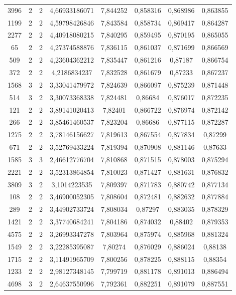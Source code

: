 \begin{longtable}{|c|c|c|c|c|c|c|c|}
3996 & 2 & 2 & 4,66933186071 & 7,844252 & 0,858316 & 0,868986 & 0,863855 \\
1199 & 2 & 2 & 4,59798426846 & 7,843584 & 0,858734 & 0,869417 & 0,864287 \\
2277 & 2 & 2 & 4,40918080215 & 7,840295 & 0,859495 & 0,870195 & 0,865055 \\
65 & 2 & 2 & 4,27374588876 & 7,836115 & 0,861037 & 0,871699 & 0,866569 \\
509 & 2 & 2 & 4,23604362212 & 7,835447 & 0,861216 & 0,87187 & 0,866754 \\
372 & 2 & 2 & 4,2186834237 & 7,832528 & 0,861679 & 0,87233 & 0,867237 \\
1568 & 3 & 2 & 3,33041479972 & 7,824639 & 0,866097 & 0,875239 & 0,871448 \\
514 & 3 & 2 & 3,30073368338 & 7,824481 & 0,86684 & 0,876017 & 0,872235 \\
121 & 2 & 2 & 3,89141020413 & 7,82401 & 0,866722 & 0,876974 & 0,872142 \\
266 & 2 & 2 & 3,85461460537 & 7,823204 & 0,86686 & 0,877115 & 0,872287 \\
1275 & 2 & 2 & 3,78146156627 & 7,819613 & 0,867554 & 0,877834 & 0,87299 \\
671 & 2 & 2 & 3,52769433224 & 7,819394 & 0,870908 & 0,881146 & 0,87633 \\
1585 & 3 & 3 & 2,46612776704 & 7,810868 & 0,871515 & 0,878003 & 0,875294 \\
2221 & 2 & 2 & 3,52313864854 & 7,810023 & 0,871427 & 0,881631 & 0,876832 \\
3809 & 3 & 2 & 3,1014223535 & 7,809397 & 0,871783 & 0,880742 & 0,877134 \\
108 & 2 & 2 & 3,46900052305 & 7,808604 & 0,872481 & 0,882632 & 0,877884 \\
289 & 2 & 2 & 3,44902733724 & 7,808034 & 0,87297 & 0,883035 & 0,878329 \\
1421 & 2 & 2 & 3,37740684241 & 7,804186 & 0,874032 & 0,88402 & 0,879353 \\
4575 & 2 & 2 & 3,26993347278 & 7,803964 & 0,875974 & 0,885968 & 0,881324 \\
1549 & 2 & 2 & 3,22285395087 & 7,80274 & 0,876029 & 0,886024 & 0,88138 \\
1715 & 2 & 2 & 3,11491965709 & 7,800256 & 0,878225 & 0,888115 & 0,88354 \\
1233 & 2 & 2 & 2,98127348145 & 7,799719 & 0,881178 & 0,891013 & 0,886494 \\
4698 & 3 & 2 & 2,64637550996 & 7,792361 & 0,882251 & 0,891079 & 0,887551 \\

\end{longtable}
